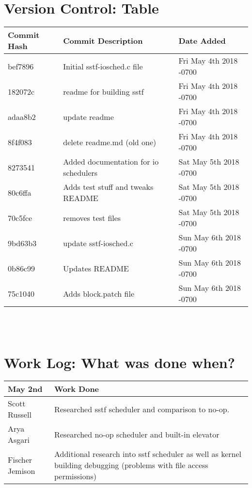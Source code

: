 \documentclass[onecolumn, draftclsnofoot,10pt, compsoc]{IEEEtran}
\begin{document}
\section{Version Control: Table}
  \begin{tabular} {| p{2.0cm} | p{7.4cm}  | p{3.0cm} | }
\hline
\textbf{Commit Hash} & \textbf{Commit Description} & \textbf{Date Added}  \\
\hline bef7896 & Initial sstf-iosched.c file & Fri May 4th 2018 -0700 \\
\hline 182072c & readme for building sstf & Fri May 4th 2018 -0700 \\
\hline adaa8b2 & update readme & Fri May 4th 2018 -0700 \\
\hline 8f4f083 & delete readme.md (old one) & Fri May 4th 2018 -0700 \\
\hline 8273541 & Added documentation for io schedulers & Sat May 5th 2018 -0700 \\

\hline 80c6ffa & Adds test stuff and tweaks README & Sat May 5th 2018 -0700 \\

\hline 70c5fce & removes test files & Sat May 5th 2018 -0700 \\

\hline 9bd63b3 & update sstf-iosched.c &  Sun May 6th 2018 -0700 \\

\hline 0b86c99 & Updates README &  Sun May 6th 2018 -0700 \\

\hline  75c1040 & Adds block.patch file &  Sun May 6th 2018 -0700 \\


\hline
\end {tabular}
\\ \\



\section{Work Log: What was done when?}
\begin{tabular} {| p{2.5cm} | p{8.4cm}|}

\hline
\textbf{May 2nd} & \textbf{Work Done} \\
\hline 
Scott Russell & Researched sstf scheduler and comparison to no-op.\\

\hline 
\hline 
Arya Asgari &  Researched no-op scheduler and built-in elevator \\

\hline 
\hline 
Fischer Jemison & Additional research into sstf scheduler as well as kernel building debugging (problems with file access permissions) \\

\hline 
\end {tabular}
\\ \\
\end{document}

